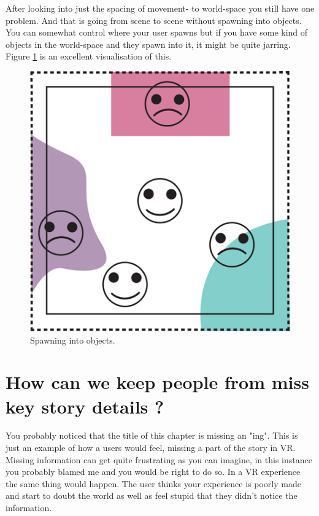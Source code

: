 \documentclass{report}
\begin{document}
				After looking into just the spacing of movement- to world-space you still have one problem. And that is going from scene to scene without spawning into objects. You can somewhat control where your user spawns but if you have some kind of objects in the world-space and they spawn into it, it might be quite jarring. Figure \ref{fig:area_object} is an excellent visualisation of this. 
				
				\begin{figure}[h!]
					\centering
					\includegraphics[width=\linewidth/3]{img/area_in_object.png}
					\caption{Spawning into objects.} 
					\label{fig:area_object}
				\end{figure}
				
				\chapter{How can we keep people from miss key story details ?}
				
				You probably noticed that the title of this chapter is missing an "ing". This is just an example of how a users would feel, missing a part of the story in VR. Missing information can get quite frustrating as you can imagine, in this instance you probably blamed me and you would be right to do so. In a VR experience the same thing would happen. The user thinks your experience is poorly made and start to doubt the world as well as feel stupid that they didn't notice the information.
				
\end{document}
